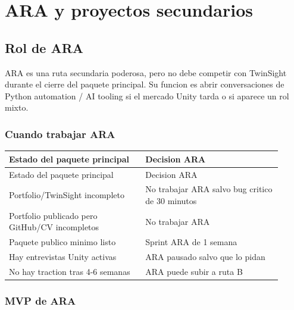 \chapter{ARA y proyectos secundarios}

\section{Rol de ARA}


ARA es una ruta secundaria poderosa, pero no debe competir con TwinSight durante el cierre del paquete principal. Su funcion es abrir conversaciones de Python automation / AI tooling si el mercado Unity tarda o si aparece un rol mixto.


\subsection{Cuando trabajar ARA}


\begin{center}
\scriptsize
\begin{longtable}{>{\raggedright\arraybackslash}p{0.455\linewidth} >{\raggedright\arraybackslash}p{0.455\linewidth}}
\toprule
Estado del paquete principal & Decision ARA \\
\midrule
\endfirsthead
\toprule
Estado del paquete principal & Decision ARA \\
\midrule
\endhead
Portfolio/TwinSight incompleto & No trabajar ARA salvo bug critico de 30 minutos \\
Portfolio publicado pero GitHub/CV incompletos & No trabajar ARA \\
Paquete publico minimo listo & Sprint ARA de 1 semana \\
Hay entrevistas Unity activas & ARA pausado salvo que lo pidan \\
No hay traction tras 4-6 semanas & ARA puede subir a ruta B \\
\bottomrule
\end{longtable}
\end{center}



\subsection{MVP de ARA}


